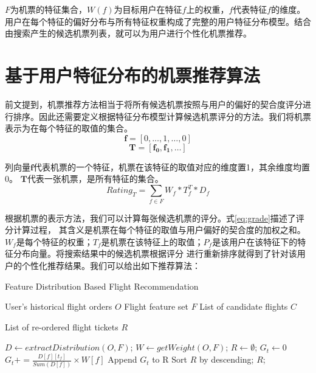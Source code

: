 $F$为机票的特征集合，$W(f)$为目标用户在特征$f$上的权重，$f$代表特征$f$的维度。用户在每个特征的偏好分布与所有特征权重构成了完整的用户特征分布模型。结合由搜索产生的候选机票列表，就可以为用户进行个性化机票推荐。

\section{基于用户特征分布的机票推荐算法}
\label{sec:base_rec}

前文提到，机票推荐方法相当于将所有候选机票按照与用户的偏好的契合度评分进行排序。因此还需要定义根据特征分布模型计算候选机票评分的方法。我们将机票表示为在每个特征的取值的集合。
\begin{equation}
  \mathbf{f} = [0,\dots,1,\dots,0]
\end{equation}
\begin{equation}
  \mathbf{T} = [\mathbf{f_0},\mathbf{f_1},\dots]
\end{equation}\par
列向量$\mathbf{f}$代表机票的一个特征，机票在该特征的取值对应的维度置1，其余维度均置0。 $\mathbf{T}$代表一张机票，是所有特征的集合。
\begin{equation}
	\label{eq:grade}
	Rating_T = \sum_{f \in F}W_f*T_f^T*D_f
\end{equation}

根据机票的表示方法，我们可以计算每张候选机票的评分。式\ref{eq:grade}描述了评分计算过程，
其含义是机票在每个特征的取值与用户偏好的契合度的加权之和。$W_f$是每个特征的权重；$T_f$是机票在该特征上的取值；$P_f$是该用户在该特征下的特征分布向量。将搜索结果中的候选机票根据评分
进行重新排序就得到了针对该用户的个性化推荐结果。我们可以给出如下推荐算法：

\begin{algorithm}
\caption{Feature Distribution Based Flight Recommendation}
\label{algo:pref_rec}
\begin{algorithmic}[1]
\Require
\Statex User's historical flight orders $O$
\Statex Flight feature set $F$
\Statex List of candidate flights $C$

\Ensure 
\Statex List of re-ordered flight tickets $R$

\State $D \gets extractDistribution(O,F)$;
\State $W \gets getWeight(O,F)$;
\State $R \gets \emptyset$;
\State $G_t \gets 0$
\State $G_t += \frac{D[f][t_f]}{Sum(D[f])} \times W[f] $
\EndFor
\State Append $G_t$ to R
\EndFor 
\State Sort $R$ by descending;
\State \Return $R$;
\end{algorithmic}
\end{algorithm}


